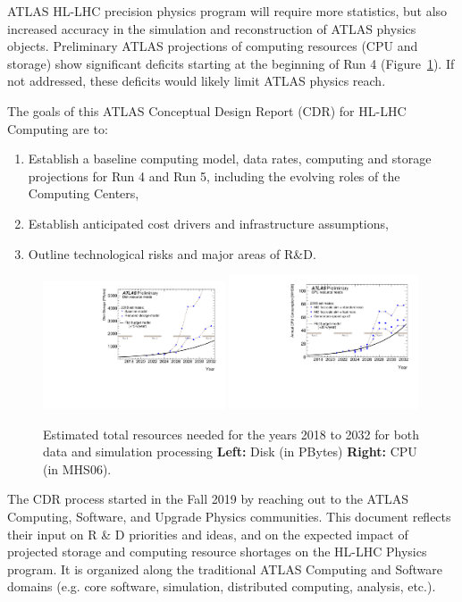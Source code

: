  ATLAS HL-LHC precision physics program will require more statistics, but also increased accuracy in the simulation and reconstruction of ATLAS physics objects. Preliminary ATLAS projections of computing resources (CPU and storage) show significant deficits starting at the beginning of Run 4 (Figure~\ref{fig:2018Res}). If not addressed, these deficits would likely limit ATLAS physics reach.
  
 The goals of this ATLAS Conceptual Design Report (CDR) for HL-LHC Computing are to:
\begin{enumerate}
    \item Establish a baseline computing model, data rates, computing and storage projections for Run 4 and Run 5, including the evolving roles of the Computing Centers,
    \item Establish anticipated cost drivers and infrastructure assumptions,
    \item Outline technological risks and major areas of R\&D.
\end{enumerate}

\begin{figure}[htb!]
  \centering
  \includegraphics[width=0.48\textwidth]{figures/diskHLLHC_2018.pdf}
  \includegraphics[width=0.50\textwidth]{figures/cpuHLLHC_2018.pdf}
  \caption{ 
Estimated total resources needed for the years 2018 to 2032 for both data and simulation processing {\bf Left:} Disk (in PBytes)  {\bf Right:} CPU (in MHS06).}
  \label{fig:2018Res}
\end{figure}


The CDR process started in the Fall 2019 by reaching out to the ATLAS Computing, Software, and Upgrade Physics communities. This document reflects their input on R \& D priorities and ideas, and on the expected impact of projected storage and computing resource shortages on the HL-LHC Physics program.  It is organized along the traditional ATLAS Computing and Software domains (e.g. core software, simulation, distributed computing, analysis, etc.). 

